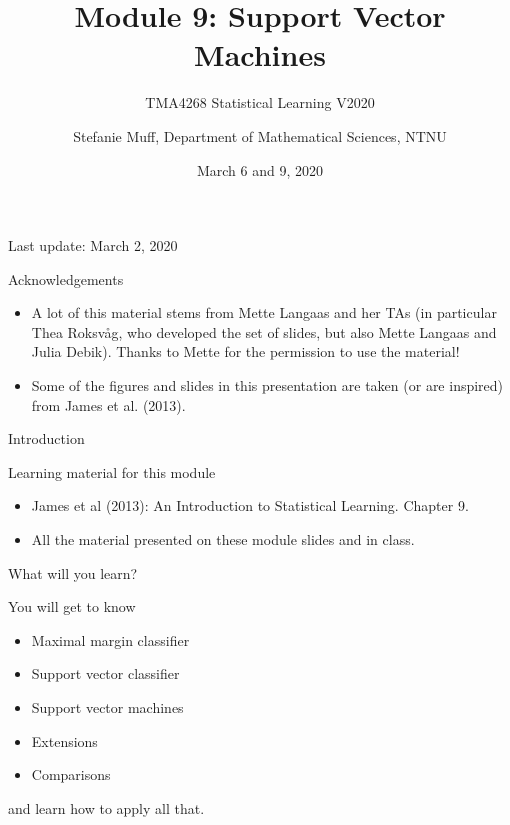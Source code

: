 \documentclass[10pt,ignorenonframetext,]{beamer}
\title{Module 9: Support Vector Machines}
\subtitle{TMA4268 Statistical Learning V2020}
\author{Stefanie Muff, Department of Mathematical Sciences, NTNU}
\date{March 6 and 9, 2020}
\providecommand{\tightlist}{%
  \setlength{\itemsep}{0pt}\setlength{\parskip}{0pt}}
\begin{document}
\frame{\titlepage}

\begin{frame}

Last update: March 2, 2020

\end{frame}

\begin{frame}{Acknowledgements}
\protect\hypertarget{acknowledgements}{}

\begin{itemize}
\item
  A lot of this material stems from Mette Langaas and her TAs (in
  particular Thea Roksv\aa g, who developed the set of slides, but also
  Mette Langaas and Julia Debik). Thanks to Mette for the permission to
  use the material!
\item
  Some of the figures and slides in this presentation are taken (or are
  inspired) from James et al. (2013).
\end{itemize}

\end{frame}

\begin{frame}{Introduction}
\protect\hypertarget{introduction}{}

\begin{block}{Learning material for this module}

\vspace{2mm}

\begin{itemize}
\tightlist
\item
  James et al (2013): An Introduction to Statistical Learning. Chapter
  9.\\
\item
  All the material presented on these module slides and in class.
\end{itemize}

\end{block}

\end{frame}

\begin{frame}

\begin{block}{What will you learn?}

\vspace{2mm}

You will get to know

\begin{itemize}
\tightlist
\item
  Maximal margin classifier
\item
  Support vector classifier
\item
  Support vector machines
\item
  Extensions
\item
  Comparisons
\end{itemize}

and learn how to apply all that.

\end{block}

\end{frame}
\end{document}
